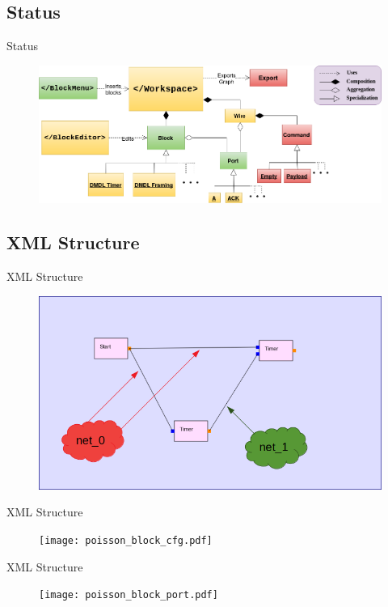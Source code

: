 \documentclass{beamer}
\begin{document}
    \subsection{Status}
    \begin{frame}{Status}
    \centering
	    \begin{figure}
     		\includegraphics[width=\linewidth]{dmdl-editor-status.png}
     		\label{fig:uml-status}
	    \end{figure}
    \end{frame}
\fi

\subsection*{XML Structure}
\begin{frame}{XML Structure}
    \begin{figure}
        \includegraphics[width=\linewidth]{poisson_nets.png}
        \label{fig:poisson_nets}
    \end{figure}
\end{frame}
\begin{frame}{XML Structure}
    \begin{figure}
        \texttt{[image: poisson\_block\_cfg.pdf]}
        \label{fig:poisson_block_cfg}
    \end{figure}
\end{frame}
\begin{frame}{XML Structure}
    \begin{figure}
        \texttt{[image: poisson\_block\_port.pdf]}
        \label{fig:poisson_block_port}
    \end{figure}
\end{frame}
\end{document}
